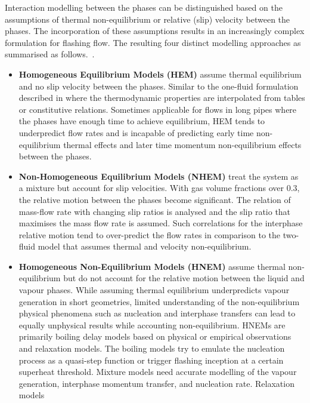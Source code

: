 Interaction modelling between the phases can be distinguished based on the assumptions of thermal non-equilibrium or relative (slip) velocity between the phases. 
The incorporation of these assumptions results in an increasingly complex formulation for flashing flow.
The resulting four distinct modelling approaches as summarised as follows.~\cite{liaoComputationalModellingFlash2017, liaoReviewNumericalModelling2021, wallisCriticalTwophaseFlow1980, dangleComputationalFluidDynamics2018}. 
\begin{itemize}
  \item \textbf{Homogeneous Equilibrium Models (HEM)} assume thermal equilibrium and no slip velocity between the phases. 
  Similar to the one-fluid formulation described in  where the thermodynamic properties are interpolated from tables or constitutive relations.
  Sometimes applicable for flows in long pipes where the phases have enough time to achieve equilibrium, HEM tends to underpredict flow rates and
  is incapable of predicting early time non-equilibrium thermal effects and later time momentum non-equilibrium effects between the phases.
  \item \textbf{Non-Homogeneous Equilibrium Models (NHEM)} treat the system as a mixture but account for slip velocities. With gas volume fractions over \(0.3\),
  the relative motion between the phases become significant. The relation of mass-flow rate with changing 
  slip ratios is analysed and the slip ratio that maximises the mass flow rate is assumed. Such correlations for the interphase relative motion tend to over-predict the 
  flow rates in comparison to the two-fluid model that assumes thermal and velocity non-equilibrium. 
  \item \textbf{Homogeneous Non-Equilibrium Models (HNEM)} assume thermal non-equilibrium but do not account for the relative motion between the liquid and vapour phases.
  While assuming thermal equilibrium underpredicts vapour generation in short geometries, limited understanding of the non-equilibrium physical phenomena such as nucleation 
  and interphase transfers can lead to equally unphysical results while accounting non-equilibrium. HNEMs are primarily boiling delay models based on physical or empirical 
  observations and relaxation models. The boiling models try to emulate the nucleation process as a quasi-step function or trigger flashing inception at a certain
  superheat threshold. Mixture models need accurate modelling of the vapour generation, interphase momentum transfer, and nucleation rate. Relaxation models

\end{itemize}

